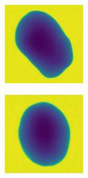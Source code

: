 \documentclass[11pt]{article}
\begin{document}
\clearpage
    \begin{figure}[!h]
    \captionsetup[subfigure]{labelformat=empty}
    \ContinuedFloat
    \captionsetup{list=no}
    \begin{subfigure}[b]{0.22\textwidth}
         \centering
         \includegraphics[width=\textwidth]{figurer/potato_dataset/perfect/perfect_44.jpg}
         \caption{}
         \label{fig:perfect_44}
     \end{subfigure}
     \hfill
     \begin{subfigure}[b]{0.22\textwidth}
         \centering
         \includegraphics[width=\textwidth]{figurer/potato_dataset/perfect/perfect_45.jpg}

\end{subfigure}
\end{figure}
\end{document}
